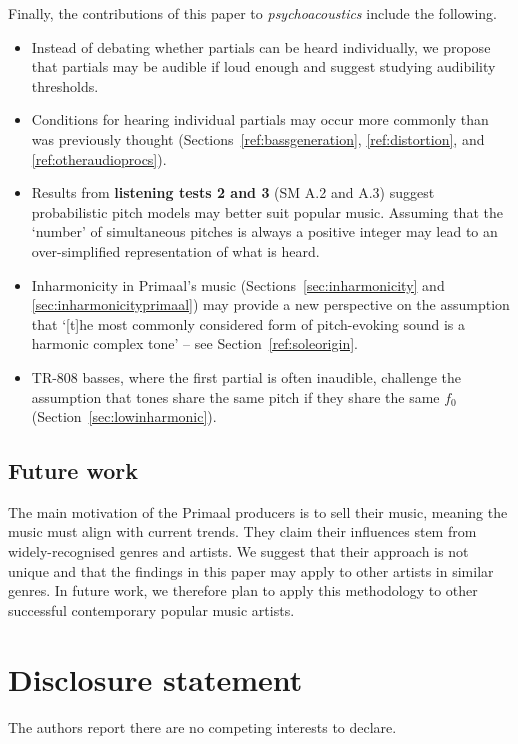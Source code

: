\documentclass{article}
\begin{document}
Finally, the contributions of this paper to \emph{psychoacoustics} include the following.

\begin{itemize}[noitemsep]
    \item Instead of debating whether partials can be heard individually, we propose that partials may be audible if loud enough and suggest studying audibility thresholds.
    \item Conditions for hearing individual partials may occur more commonly than was previously thought (Sections~\ref{ref:bassgeneration}, \ref{ref:distortion}, and \ref{ref:otheraudioprocs}).
    \item Results from \textbf{listening tests 2 and 3} (SM A.2 and A.3) suggest probabilistic pitch models may better suit popular music. Assuming that the `number' of simultaneous pitches is always a positive integer may lead to an over-simplified representation of what is heard.
    \item Inharmonicity in Primaal's music (Sections~\ref{sec:inharmonicity} and \ref{sec:inharmonicityprimaal}) may provide a new perspective on the assumption that `[t]he most commonly considered form of pitch-evoking sound is a harmonic complex tone' \citep{oxenham2012pitch} -- see Section~\ref{ref:soleorigin}.
    \item TR-808 basses, where the first partial is often inaudible, challenge the assumption that tones share the same pitch if they share the same $f_0$ (Section~\ref{sec:lowinharmonic}).
\end{itemize}




\subsection{Future work}

The main motivation of the Primaal producers is to sell their music, meaning the music must align with current trends. They claim their influences stem from widely-recognised genres and artists. We suggest that their approach is not unique and that the findings in this paper may apply to other artists in similar genres. In future work, we therefore plan to apply this methodology to other successful contemporary popular music artists.




\section*{Disclosure statement}

The authors report there are no competing interests to declare.




\end{document}

